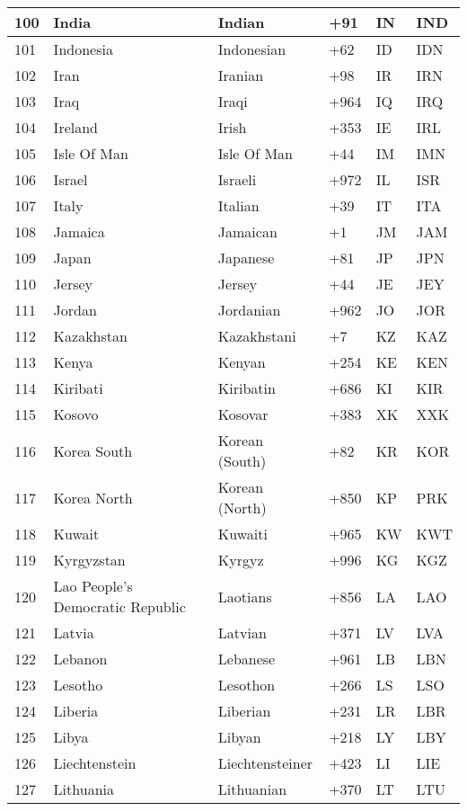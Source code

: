\begin{longtable}{|l|l|l|l|l|l|}
100 & India & Indian & +91 & IN & IND \\ \hline 
101 & Indonesia & Indonesian & +62 & ID & IDN \\ \hline 
102 & Iran & Iranian & +98 & IR & IRN \\ \hline 
103 & Iraq & Iraqi & +964 & IQ & IRQ \\ \hline 
104 & Ireland & Irish & +353 & IE & IRL \\ \hline 
105 & Isle Of Man & Isle Of Man & +44 & IM & IMN \\ \hline 
106 & Israel & Israeli & +972 & IL & ISR \\ \hline 
107 & Italy & Italian & +39 & IT & ITA \\ \hline 
108 & Jamaica & Jamaican & +1 & JM & JAM \\ \hline 
109 & Japan & Japanese & +81 & JP & JPN \\ \hline 
110 & Jersey & Jersey & +44 & JE & JEY \\ \hline 
111 & Jordan & Jordanian & +962 & JO & JOR \\ \hline 
112 & Kazakhstan & Kazakhstani & +7 & KZ & KAZ \\ \hline 
113 & Kenya & Kenyan & +254 & KE & KEN \\ \hline 
114 & Kiribati & Kiribatin & +686 & KI & KIR \\ \hline 
115 & Kosovo & Kosovar & +383 & XK & XXK \\ \hline 
116 & Korea South & Korean (South) & +82 & KR & KOR \\ \hline 
117 & Korea North & Korean (North) & +850 & KP & PRK \\ \hline 
118 & Kuwait & Kuwaiti & +965 & KW & KWT \\ \hline 
119 & Kyrgyzstan & Kyrgyz & +996 & KG & KGZ \\ \hline 
120 & Lao People's Democratic Republic & Laotians & +856 & LA & LAO \\ \hline 
121 & Latvia & Latvian & +371 & LV & LVA \\ \hline 
122 & Lebanon & Lebanese & +961 & LB & LBN \\ \hline 
123 & Lesotho & Lesothon & +266 & LS & LSO \\ \hline 
124 & Liberia & Liberian & +231 & LR & LBR \\ \hline 
125 & Libya & Libyan & +218 & LY & LBY \\ \hline 
126 & Liechtenstein & Liechtensteiner & +423 & LI & LIE \\ \hline 
127 & Lithuania & Lithuanian & +370 & LT & LTU \\ \hline 

\end{longtable}
